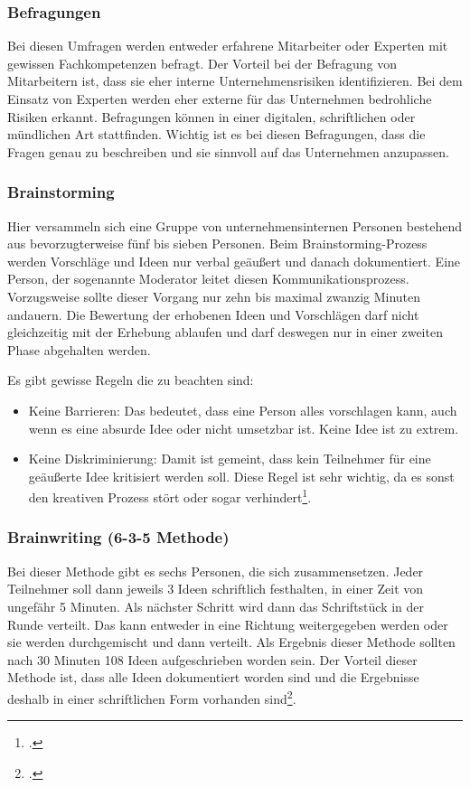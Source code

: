 \subsubsection{Befragungen}
Bei diesen Umfragen werden entweder erfahrene Mitarbeiter oder Experten mit gewissen Fachkompetenzen befragt. Der Vorteil bei der Befragung von Mitarbeitern ist, dass sie eher interne Unternehmensrisiken identifizieren. Bei dem Einsatz von Experten werden eher externe für das Unternehmen bedrohliche Risiken erkannt. Befragungen können in einer digitalen, schriftlichen oder mündlichen Art stattfinden.
Wichtig ist es bei diesen Befragungen, dass die Fragen genau zu beschreiben und sie sinnvoll auf das Unternehmen anzupassen.

\subsubsection{Brainstorming}
Hier versammeln sich eine Gruppe von unternehmensinternen Personen bestehend aus bevorzugterweise fünf bis sieben Personen. 
Beim Brainstorming-Prozess werden Vorschläge und Ideen nur verbal geäußert und danach dokumentiert. Eine Person, der sogenannte Moderator leitet diesen Kommunikationsprozess. Vorzugsweise sollte dieser Vorgang nur zehn bis maximal zwanzig Minuten andauern.
Die Bewertung der erhobenen Ideen und Vorschlägen darf nicht gleichzeitig mit der Erhebung ablaufen und darf deswegen nur in einer zweiten Phase abgehalten werden. 

Es gibt gewisse Regeln die zu beachten sind:
\begin{itemize}
	\item Keine Barrieren: Das bedeutet, dass eine Person alles vorschlagen kann, auch wenn es eine absurde Idee oder nicht umsetzbar ist. Keine Idee ist zu extrem.
	\item Keine Diskriminierung: Damit ist gemeint, dass kein Teilnehmer für eine geäußerte Idee kritisiert werden soll. Diese Regel ist sehr wichtig, da es sonst den kreativen Prozess stört oder sogar verhindert\footcite{risikomanagement-diplomarbeit-methoden}.
\end{itemize}

\subsubsection{Brainwriting (6-3-5 Methode)}
Bei dieser Methode gibt es sechs Personen, die sich zusammensetzen. Jeder Teilnehmer soll dann jeweils 3 Ideen schriftlich festhalten, in einer Zeit von ungefähr 5 Minuten.
Als nächster Schritt wird dann das Schriftstück in der Runde verteilt. Das kann entweder in eine Richtung weitergegeben werden oder sie werden durchgemischt und dann verteilt. 
Als Ergebnis dieser Methode sollten nach 30 Minuten 108 Ideen aufgeschrieben worden sein.
Der Vorteil dieser Methode ist, dass alle Ideen dokumentiert worden sind und die Ergebnisse deshalb in einer schriftlichen Form vorhanden sind\footcite{risikomanagement-diplomarbeit-methoden}.

